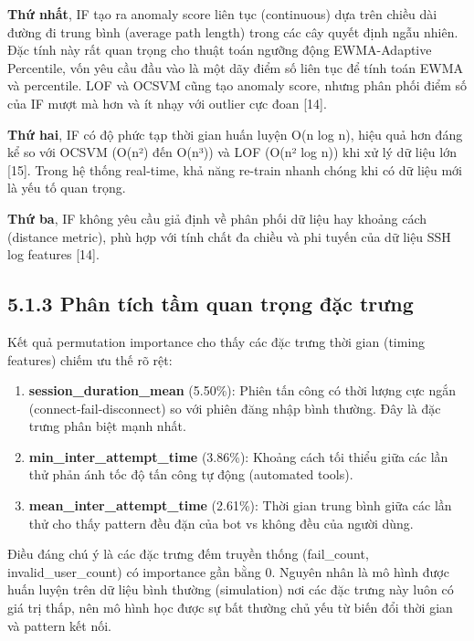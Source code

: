 \documentclass[
  a4paper]{report}
\providecommand{\tightlist}{%
  \setlength{\itemsep}{0pt}\setlength{\parskip}{0pt}}
\begin{document}
\textbf{Thứ nhất}, IF tạo ra anomaly score liên tục (continuous) dựa
trên chiều dài đường đi trung bình (average path length) trong các cây
quyết định ngẫu nhiên. Đặc tính này rất quan trọng cho thuật toán ngưỡng
động EWMA-Adaptive Percentile, vốn yêu cầu đầu vào là một dãy điểm số
liên tục để tính toán EWMA và percentile. LOF và OCSVM cũng tạo anomaly
score, nhưng phân phối điểm số của IF mượt mà hơn và ít nhạy với outlier
cực đoan {[}14{]}.

\textbf{Thứ hai}, IF có độ phức tạp thời gian huấn luyện O(n log n),
hiệu quả hơn đáng kể so với OCSVM (O(n²) đến O(n³)) và LOF (O(n² log n))
khi xử lý dữ liệu lớn {[}15{]}. Trong hệ thống real-time, khả năng
re-train nhanh chóng khi có dữ liệu mới là yếu tố quan trọng.

\textbf{Thứ ba}, IF không yêu cầu giả định về phân phối dữ liệu hay
khoảng cách (distance metric), phù hợp với tính chất đa chiều và phi
tuyến của dữ liệu SSH log features {[}14{]}.

\subsection{5.1.3 Phân tích tầm quan trọng đặc
trưng}\label{phuxe2n-tuxedch-tux1ea7m-quan-trux1ecdng-ux111ux1eb7c-trux1b0ng}

Kết quả permutation importance cho thấy các đặc trưng thời gian (timing
features) chiếm ưu thế rõ rệt:

\begin{enumerate}
\def\labelenumi{\arabic{enumi}.}
\tightlist
\item
  \textbf{session\_duration\_mean} (5.50\%): Phiên tấn công có thời
  lượng cực ngắn (connect-fail-disconnect) so với phiên đăng nhập bình
  thường. Đây là đặc trưng phân biệt mạnh nhất.
\item
  \textbf{min\_inter\_attempt\_time} (3.86\%): Khoảng cách tối thiểu
  giữa các lần thử phản ánh tốc độ tấn công tự động (automated tools).
\item
  \textbf{mean\_inter\_attempt\_time} (2.61\%): Thời gian trung bình
  giữa các lần thử cho thấy pattern đều đặn của bot vs không đều của
  người dùng.
\end{enumerate}

Điều đáng chú ý là các đặc trưng đếm truyền thống (fail\_count,
invalid\_user\_count) có importance gần bằng 0. Nguyên nhân là mô hình
được huấn luyện trên dữ liệu bình thường (simulation) nơi các đặc trưng
này luôn có giá trị thấp, nên mô hình học được sự bất thường chủ yếu từ
biến đổi thời gian và pattern kết nối.
\end{document}
